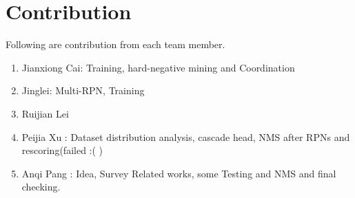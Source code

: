 \documentclass[10pt,twocolumn,letterpaper]{article}
\begin{document}
\section{Contribution}
Following are contribution from each team member.
\begin{enumerate}
\item Jianxiong Cai: Training, hard-negative mining and Coordination
\item Jinglei: Multi-RPN, Training
\item Ruijian Lei
\item Peijia Xu : Dataset distribution analysis, cascade head, NMS after RPNs and rescoring(failed :( )
\item Anqi Pang : Idea, Survey Related works, some Testing and NMS and final checking.
\end{enumerate}

{\small


}
\end{document}
